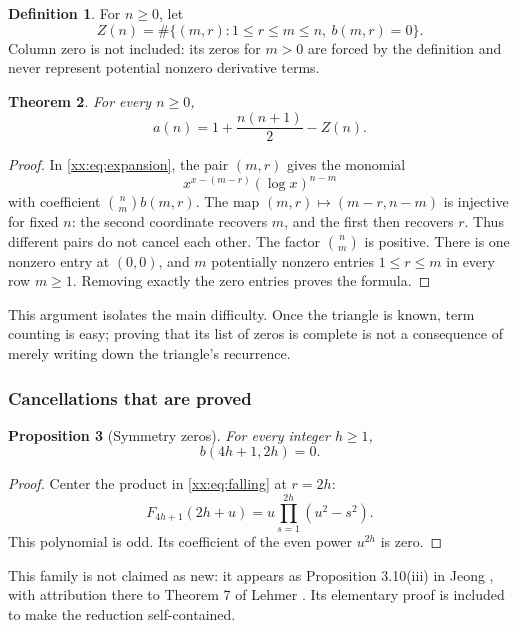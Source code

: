 \documentclass[11pt,a4paper]{article}
\numberwithin{equation}{section}
\newtheorem{theorem}{Theorem}[section]
\newtheorem{proposition}[theorem]{Proposition}
\theoremstyle{definition}
\newtheorem{definition}[theorem]{Definition}
\theoremstyle{remark}
\theoremstyle{plain}
\begin{document}
\begin{definition}
For $n\ge0$, let
\[
 Z(n)=\#\{(m,r):1\le r\le m\le n,\ b(m,r)=0\}.
\]
Column zero is not included: its zeros for $m>0$ are forced by the definition
and never represent potential nonzero derivative terms.
\end{definition}

\begin{theorem}\label{xx:thm:count}
For every $n\ge0$,
\begin{equation}\label{xx:eq:count}
 \boxed{\displaystyle a(n)=1+\frac{n(n+1)}2-Z(n).}
\end{equation}
\end{theorem}
\begin{proof}
In \eqref{xx:eq:expansion}, the pair $(m,r)$ gives the monomial
\[
 x^{x-(m-r)}(\log x)^{n-m}
\]
with coefficient $\binom nm b(m,r)$. The map
$(m,r)\mapsto(m-r,n-m)$ is injective for fixed $n$: the second coordinate
recovers $m$, and the first then recovers $r$. Thus different pairs do not
cancel each other. The factor $\binom nm$ is positive. There is one nonzero
entry at $(0,0)$, and $m$ potentially nonzero entries $1\le r\le m$ in every
row $m\ge1$. Removing exactly the zero entries proves the formula.
\end{proof}

This argument isolates the main difficulty. Once the triangle is known,
term counting is easy; proving that its list of zeros is complete is not
a consequence of merely writing down the triangle's recurrence.

\subsubsection{Cancellations that are proved}
\begin{proposition}[Symmetry zeros]\label{xx:prop:symmetry}
For every integer $h\ge1$,
\begin{equation}\label{xx:eq:symmetry}
 b(4h+1,2h)=0.
\end{equation}
\end{proposition}
\begin{proof}
Center the product in \eqref{xx:eq:falling} at $r=2h$:
\[
 F_{4h+1}(2h+u)=u\prod_{s=1}^{2h}(u^2-s^2).
\]
This polynomial is odd. Its coefficient of the even power $u^{2h}$ is zero.
\end{proof}

This family is not claimed as new: it appears as Proposition 3.10(iii) in
Jeong \cite{jeong}, with attribution there to Theorem 7 of Lehmer
\cite{lehmer}. Its elementary proof is included to make the reduction
self-contained.
\end{document}
